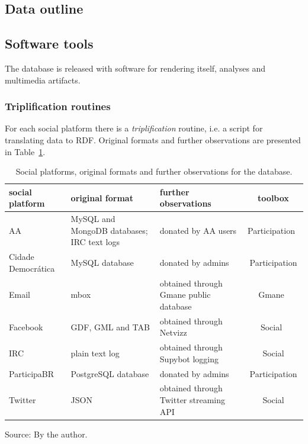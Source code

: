 \subsection{Data outline}


\subsection{Software tools}
The database is released with software for rendering itself, analyses and
multimedia artifacts.
\subsubsection{Triplification routines}
For each social platform there is a \emph{triplification} routine,
i.e. a script for translating data to RDF.
Original formats and further observations are presented in
Table~\ref{tab:provenance}.
\begin{table}[h!]\scriptsize
\begin{center}
\caption{Social platforms, original formats and further observations for
the database.}\label{tab:provenance}
	\def\arraystretch{1.2}
\begin{tabular}{l || p{3cm} | p{3cm} | c}\hline
\textbf{social platform} & \textbf{original format} & \textbf{further observations} & \textbf{toolbox} \\\hline\hline
AA & MySQL and MongoDB databases; IRC text logs & donated by AA users & Participation~\cite{participation} \\\hline
Cidade Democrática & MySQL database & donated by admins & Participation \\\hline
Email & mbox & obtained through Gmane public database & Gmane~\cite{gmane} \\\hline
Facebook & GDF, GML and TAB & obtained through Netvizz~\cite{netvizz} & Social~\cite{social} \\\hline
IRC & plain text log & obtained through Supybot logging & Social \\\hline
ParticipaBR & PostgreSQL database & donated by admins & Participation \\\hline
Twitter & JSON & obtained through Twitter streaming API & Social \\\hline
\end{tabular}
\begin{flushleft}\footnotesize
Source: By the author.\
\end{flushleft}
\end{center}
\end{table} 


